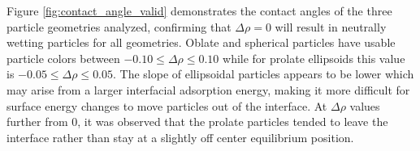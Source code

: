 Figure \ref{fig:contact_angle_valid} demonstrates the contact angles of the three particle geometries analyzed, 
confirming that $\Delta \rho = 0$ will result in neutrally wetting particles for all geometries. Oblate and spherical 
particles have usable particle colors between $-0.10 \leq \Delta \rho \leq 0.10$ while for prolate ellipsoids this 
value is $-0.05 \leq \Delta \rho \leq 0.05$. The slope of ellipsoidal particles appears to be lower which may arise 
from a larger interfacial adsorption energy, making it more difficult for surface energy changes to move particles out 
of the interface. At $\Delta \rho$ values further from 0, it was observed that the prolate particles tended to leave 
the interface rather than stay at a slightly off center equilibrium position. 